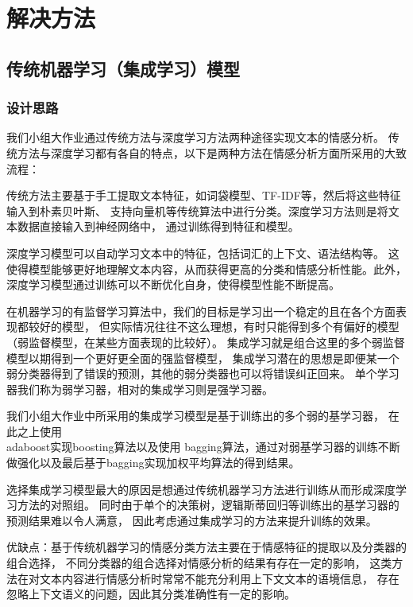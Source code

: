\documentclass[11pt]{article}
\begin{document}
    \section{解决方法}
        \subsection{传统机器学习（集成学习）模型}
            \subsubsection{设计思路}
            我们小组大作业通过传统方法与深度学习方法两种途径实现文本的情感分析。
            传统方法与深度学习都有各自的特点，以下是两种方法在情感分析方面所采用的大致流程：
            
            传统方法主要基于手工提取文本特征，如词袋模型、TF-IDF等，然后将这些特征输入到朴素贝叶斯、
            支持向量机等传统算法中进行分类。深度学习方法则是将文本数据直接输入到神经网络中，
            通过训练得到特征和模型。
            
            深度学习模型可以自动学习文本中的特征，包括词汇的上下文、语法结构等。
            这使得模型能够更好地理解文本内容，从而获得更高的分类和情感分析性能。此外，
            深度学习模型通过训练可以不断优化自身，使得模型性能不断提高。
            
            在机器学习的有监督学习算法中，我们的目标是学习出一个稳定的且在各个方面表现都较好的模型，
            但实际情况往往不这么理想，有时只能得到多个有偏好的模型（弱监督模型，在某些方面表现的比较好）。
            集成学习就是组合这里的多个弱监督模型以期得到一个更好更全面的强监督模型，
            集成学习潜在的思想是即便某一个弱分类器得到了错误的预测，其他的弱分类器也可以将错误纠正回来。
            单个学习器我们称为弱学习器，相对的集成学习则是强学习器。
            
            我们小组大作业中所采用的集成学习模型是基于训练出的多个弱的基学习器，
            在此之上使用\\adaboost实现boosting算法以及使用
            bagging算法，通过对弱基学习器的训练不断做强化以及最后基于bagging实现加权平均算法的得到结果。
            
            选择集成学习模型最大的原因是想通过传统机器学习方法进行训练从而形成深度学习方法的对照组。
            同时由于单个的决策树，逻辑斯蒂回归等训练出的基学习器的预测结果难以令人满意，
            因此考虑通过集成学习的方法来提升训练的效果。
            
            优缺点：基于传统机器学习的情感分类方法主要在于情感特征的提取以及分类器的组合选择，
            不同分类器的组合选择对情感分析的结果有存在一定的影响，
            这类方法在对文本内容进行情感分析时常常不能充分利用上下文文本的语境信息，
            存在忽略上下文语义的问题，因此其分类准确性有一定的影响。
\end{document}
